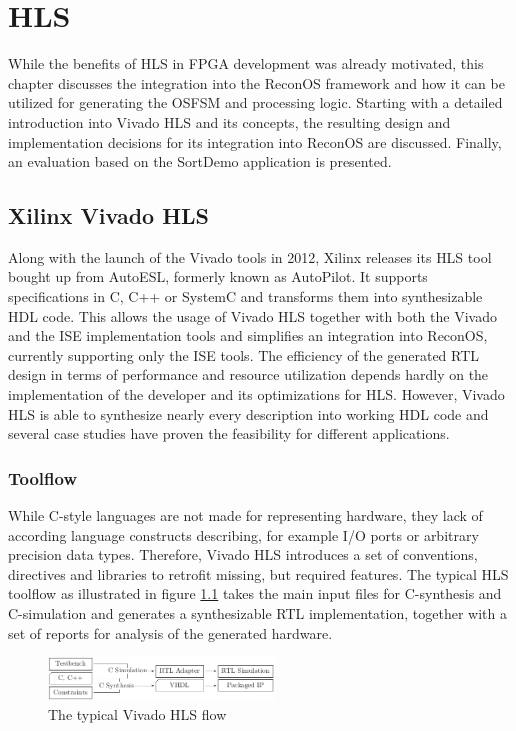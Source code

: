 \chapter{\acl{HLS}}
\label{sec:hls}
While the benefits of \ac{HLS} in \ac{FPGA} development was already motivated,
this chapter discusses the integration into the ReconOS framework and how it
can be utilized for generating the \ac{OSFSM} and processing logic. Starting
with a detailed introduction into Vivado HLS and its concepts, the resulting
design and implementation decisions for its integration into ReconOS are
discussed. Finally, an evaluation based on the SortDemo application is
presented.

\section{Xilinx Vivado HLS}
Along with the launch of the Vivado tools in 2012, Xilinx releases its
\ac{HLS} tool bought up from AutoESL, formerly known as AutoPilot. It supports
specifications in C, C++ or SystemC and transforms them into synthesizable
\ac{HDL} code. This allows the usage of Vivado \ac{HLS} together with both the
Vivado and the ISE implementation tools and simplifies an integration into
ReconOS, currently supporting only the ISE tools. The efficiency of the
generated RTL design in terms of performance and resource utilization depends
hardly on the implementation of the developer and its optimizations for
\ac{HLS}. However, Vivado HLS is able to synthesize nearly every description
into working \ac{HDL} code and several case studies \citep{SWL13,OCC14} have
proven the feasibility for different applications.

\subsection{Toolflow}
While C-style languages are not made for representing hardware, they lack of
according language constructs describing, for example I/O ports or arbitrary
precision data types. Therefore, Vivado HLS introduces a set of conventions,
directives and libraries to retrofit missing, but required features. The
typical \ac{HLS} toolflow as illustrated in figure \ref{fig:hls_flow} takes
the main input files for C-synthesis and C-simulation and generates a
synthesizable \ac{RTL} implementation, together with a set of reports for
analysis of the generated hardware.
\begin{figure}[tb]
	\centering
	\includegraphics[width=6cm]{../figures/hls_flow}
	\caption{The typical Vivado HLS flow \citep[adapted from][]{ug902}}
	\label{fig:hls_flow}
\end{figure}

